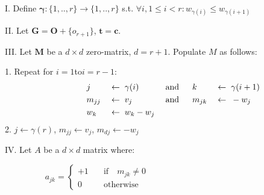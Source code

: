 \documentclass[12pt]{article}	%
\newcommand{\mys }{\hspace{0.1cm}}
\begin{document}
            \vspace{5pt}

            \noindent I. Define $\boldsymbol{\gamma}:\{1,..,r\}\rightarrow \{1,..,r\}$ \mys s.t. $\forall i, 1\leq i <r: w_{\gamma(i)} \leq w_{\gamma(i+1)}$


            \noindent II. Let $\boldsymbol{G}=\boldsymbol{O}+\{o_{r+1}\}$, \mys $\boldsymbol{t}=\boldsymbol{c}$.

            \noindent III. Let $\boldsymbol  {M}$ \mys be a $d\times d$ zero-matrix, $d=r+1$. Populate $M$ as follows:

                    \noindent\hspace{20pt}1. Repeat for \mys$i=1$\quad to\quad $i=r-1$:
                    \setlength{\belowdisplayskip}{0pt} %
                    \begin{alignat*}{7}
                                \qquad\qquad & j\mys       & \leftarrow\mys\mys   & \gamma(i)   & \mys\text{and} \quad\mys\mys & k\mys       & \leftarrow\mys\mys   & \gamma(i+1) \\
                                \qquad\qquad & m_{jj}\mys  & \leftarrow\mys\mys   & v_j         & \mys\text{and} \quad\mys\mys & m_{jk}\mys  & \leftarrow\mys\mys   & -w_j \\
                                \qquad\qquad & w_{k}\mys   & \leftarrow\mys\mys   & w_{k} - w_j & \mys                         &\mys         & \mys                 & \mys
                    \end{alignat*}
                    \noindent\hspace{20pt}2. $j\leftarrow\gamma(r)$, $m_{jj}\leftarrow v_j$, $m_{dj}\leftarrow -w_j$


            \noindent IV. Let  $A$ be a $d\times d$ matrix where:

                        \qquad $\hspace{2cm}a_{jk}  =	\scriptscriptstyle{\begin{cases}	%
                                                            +1 & \quad\textrm{if}\quad m_{jk} \neq  0 \\
                                                            0 & \quad\textrm{otherwise}
                                                    \end{cases}
                                                    }$
\end{document}
